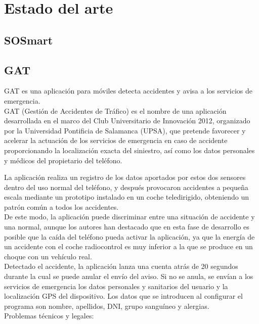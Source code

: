 \section{Estado del arte}
\subsection{SOSmart}
\subsection{GAT}

GAT es una aplicación para móviles detecta accidentes y avisa a los servicios de emergencia.\\

GAT (Gestión de Accidentes de Tráfico) es el nombre de una aplicación desarrollada en el marco del Club Universitario de Innovación 2012, organizado por la Universidad Pontificia de Salamanca (UPSA), que pretende favorecer y acelerar la actuación de los servicios de emergencia en caso de accidente proporcionando la localización exacta del siniestro, así como los datos personales y médicos del propietario del teléfono.

La aplicación realiza un registro de los datos aportados por estos dos sensores dentro del uso normal del teléfono, y después provocaron accidentes a pequeña escala mediante un prototipo instalado en un coche teledirigido, obteniendo un patrón común a todos los accidentes. \\

De este modo, la aplicación puede discriminar entre una situación de accidente y una normal, aunque los autores han destacado que en esta fase de desarrollo es posible que la caída del teléfono pueda activar la aplicación, ya que la energía de un accidente con el coche radiocontrol es muy inferior a la que se produce en un choque con un vehículo real. \\

Detectado el accidente, la aplicación lanza una cuenta atrás de 20 segundos durante la cual se puede anular el envío del aviso. Si no se anula, se envían a los servicios de emergencia los datos personales y sanitarios del usuario y la localización GPS del dispositivo. Los datos que se introducen al configurar el programa son nombre, apellidos, DNI, grupo sanguíneo y alergias.\\

Problemas técnicos y legales:\\

